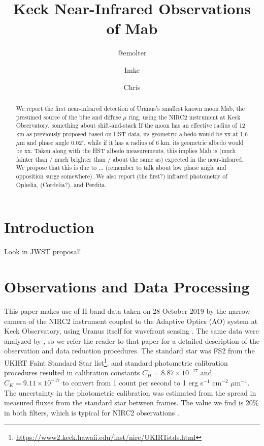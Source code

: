 \documentclass[preprint]{aastex631}
\begin{document}
	
\newcommand{\ergsec}{erg s$^{-1}$ cm$^{-2}$ $\mu$m$^{-1}$}

\title{Keck Near-Infrared Observations of Mab}

\author{@emolter}

\author{Imke}

\author{Chris}

\begin{abstract}
We report the first near-infrared detection of Uranus's smallest known moon Mab, the presumed source of the blue and diffuse $\mu$ ring, using the NIRC2 instrument at Keck Observatory.
something about shift-and-stack
If the moon has an effective radius of 12 km as previously proposed based on HST data, its geometric albedo would be xx at 1.6 $\mu$m and phase angle 0.02$^\circ$, while if it has a radius of 6 km, its geometric albedo would be xx. Taken along with the HST albedo measurements, this implies Mab is (much fainter than / much brighter than / about the same as) expected in the near-infrared. We propose that this is due to ... (remember to talk about low phase angle and opposition surge somewhere). We also report (the first?) infrared photometry of Ophelia, (Cordelia?), and Perdita.
\end{abstract}

\section{Introduction}
\label{s:intro}

Look in JWST proposal!

\section{Observations and Data Processing}
\label{s:observations}

This paper makes use of H-band data taken on 28 October 2019 by the narrow camera of the NIRC2 instrument coupled to the Adaptive Optics (AO) system at Keck Observatory, using Uranus itself for wavefront sensing \citep{wizinowich00, vandam04}. The same data were analyzed by \citet{paradis23}, so we refer the reader to that paper for a detailed description of the observation and data reduction procedures. The standard star was FS2 from the UKIRT Faint Standard Star list\footnote{\url{https://www2.keck.hawaii.edu/inst/nirc/UKIRTstds.html}}, and standard photometric calibration procedures resulted in calibration constants $C_H = 8.87\times10^{-17}$ and $C_K = 9.11\times10^{-17}$ to convert from 1 count per second to 1 \ergsec. The uncertainty in the photometric calibration was estimated from the spread in measured fluxes from the standard star between frames. The value we find is 20\% in both filters, which is typical for NIRC2 observations \citep{depater14, molter19}.
\end{document}
